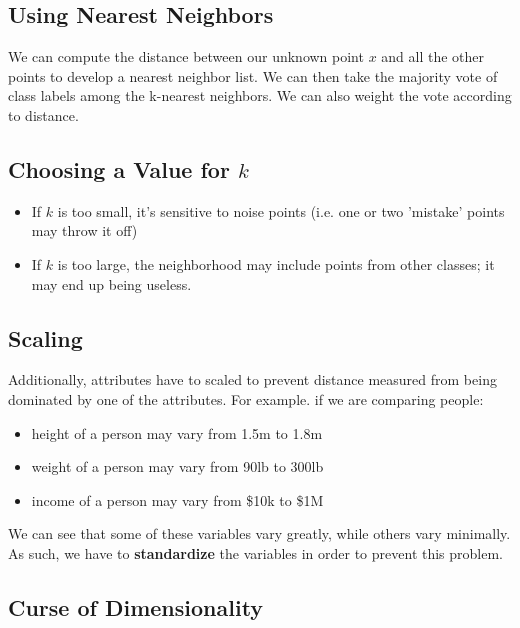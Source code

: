 \documentclass[english, 10pt]{article}
\begin{document}
\subsection{Using Nearest Neighbors}

We can compute the distance between our unknown point $x$ and all the other points to develop a nearest neighbor list. We can then take the majority vote of class labels among the k-nearest neighbors. We can also weight the vote according to distance.

\subsection{Choosing a Value for $k$}
\begin{itemize}
	\item If $k$ is too small, it's sensitive to noise points (i.e. one or two 'mistake' points may throw it off)
	\item If $k$ is too large, the neighborhood may include points from other classes; it may end up being useless.
\end{itemize}

\subsection{Scaling}

Additionally, attributes have to scaled to prevent distance measured from being dominated by one of the attributes. For example. if we are comparing people:\\

\begin{myproof}
\begin{itemize}
	\item height of a person may vary from 1.5m to 1.8m
	\item weight of a person may vary from 90lb to 300lb
	\item income of a person may vary from \$10k to \$1M
\end{itemize}
\end{myproof}

\hfill \break We can see that some of these variables vary greatly, while others vary minimally. As such, we have to \textbf{standardize} the variables in order to prevent this problem.

\subsection{Curse of Dimensionality}
\end{document}
